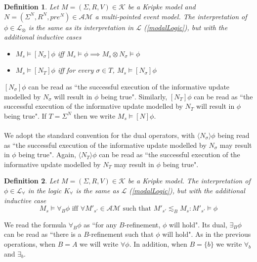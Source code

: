 \documentclass[12pt, a4paper, titlepage]{scrartcl}
\newtheorem{defn}{Definition}[section]
\numberwithin{equation}{section}
\newcommand{\sqex}[1]{[{#1}]}
\newcommand{\anex}[1]{\langle {#1} \rangle}
\newcommand{\lang}{\mathcal{L}}
\newcommand{\langRefine}{\lang_{\forall}}
\newcommand{\langActEx}{\lang_{\otimes}}
\newcommand{\kripkeClass}{\mathcal{K}}
\newcommand{\eventClass}{\mathcal{AM}}
\begin{document}
\begin{defn} \label{actModelLogic}
Let $M = (\Sigma, R, V) \in \kripkeClass$ be a Kripke model and $N = (\Sigma^N, R^N, pre^N) \in
\eventClass$ a multi-pointed event model.
The interpretation of $\phi \in \langActEx$ is the same as its interpretation in $\lang$
(\ref{modalLogic}), but with the additional
inductive cases
\begin{itemize}
	\item $M_s \models \sqex{N_\sigma} \phi$ iff $M_s \models \phi \implies M_s \otimes N_\sigma \models
	\phi$
	\item $M_s \models \sqex{N_T} \phi$ iff for every $\sigma \in T$, $M_s \models \sqex{N_\sigma} \phi$ 
\end{itemize}
\end{defn}
$\sqex{N_\sigma} \phi$ can be read as ``the successful execution of the informative update modelled by
$N_\sigma$ will result in $\phi$ being true".
Similarly, $\sqex{N_T} \phi$ can be read as ``the successful execution of the informative update
modelled by $N_T$ will result in $\phi$ being true".
If $T = \Sigma^N$ then we write $M_s \models \sqex{N} \phi$.\\
\\
We adopt the standard convention for the dual operators, with $\anex{ N_\sigma } \phi$ being
read as ``the successful execution of the informative update modelled by $N_\sigma$ may result in
$\phi$ being true".
Again, $\anex{ N_T } \phi$ can be read as ``the successful execution of the informative
update modelled by $N_T$ may result in $\phi$ being true".


\begin{defn} \label{refineLogic}
Let $M = (\Sigma, R, V) \in \kripkeClass$ be a Kripke model.
The interpretation of $\phi \in \langRefine$ in the logic $K_\forall$ is the same as $\lang$
(\ref{modalLogic}), but with the additional inductive case
\[
	M_s \models \forall_B \phi \text{ iff } \forall M'_{s'} \in \eventClass \text{ such that } M'_{s'}
	\lesssim_B M_s : M'_{s'} \models \phi
\]
\end{defn}
We read the formula $\forall_B \phi$ as ``for any $B$-refinement, $\phi$ will hold".
Its dual, $\exists_B \phi$ can be read as ``there is a $B$-refinement such that $\phi$ will hold".
As in the previous operations, when $B = A$ we will write $\forall \phi$.
In addition, when $B = \{b\}$ we write $\forall_b$ and $\exists_b$.
\end{document}
